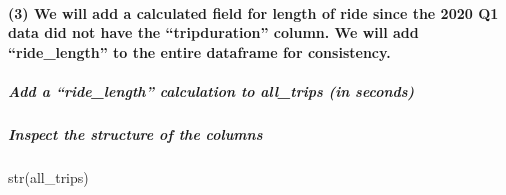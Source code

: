 \documentclass[
]{article}
\newenvironment{Shaded}{\begin{snugshade}}{\end{snugshade}}
\newcommand{\FunctionTok}[1]{\textcolor[rgb]{0.00,0.00,0.00}{#1}}
\newcommand{\NormalTok}[1]{#1}
\newcommand{\OtherTok}[1]{\textcolor[rgb]{0.56,0.35,0.01}{#1}}
\newcommand{\SpecialCharTok}[1]{\textcolor[rgb]{0.00,0.00,0.00}{#1}}
\begin{document}
\hypertarget{we-will-add-a-calculated-field-for-length-of-ride-since-the-2020-q1-data-did-not-have-the-tripduration-column.-we-will-add-ride_length-to-the-entire-dataframe-for-consistency.}{%
\paragraph{(3) We will add a calculated field for length of ride since
the 2020 Q1 data did not have the ``tripduration'' column. We will add
``ride\_length'' to the entire dataframe for
consistency.}\label{we-will-add-a-calculated-field-for-length-of-ride-since-the-2020-q1-data-did-not-have-the-tripduration-column.-we-will-add-ride_length-to-the-entire-dataframe-for-consistency.}}

\hypertarget{add-a-ride_length-calculation-to-all_trips-in-seconds}{%
\subparagraph{Add a ``ride\_length'' calculation to all\_trips (in
seconds)}\label{add-a-ride_length-calculation-to-all_trips-in-seconds}}

\begin{Shaded}
\end{Shaded}

\hypertarget{inspect-the-structure-of-the-columns}{%
\subparagraph{Inspect the structure of the
columns}\label{inspect-the-structure-of-the-columns}}

\begin{Shaded}
\begin{Highlighting}[]
\FunctionTok{str}\NormalTok{(all\_trips)}
\end{Highlighting}
\end{Shaded}
\end{document}
